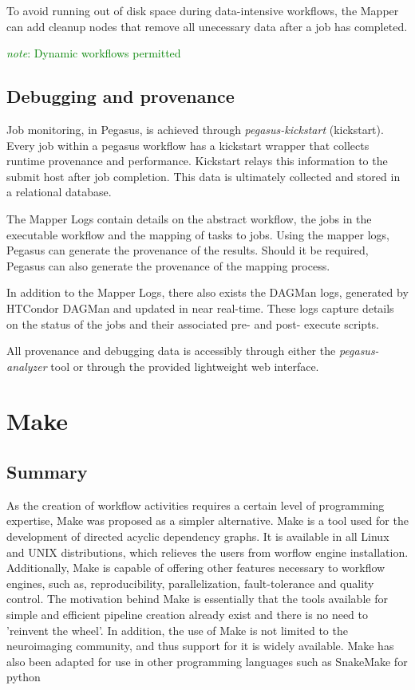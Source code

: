 \documentclass{report}
\newcommand{\note}[1]{\textcolor{green}{\textit{note}: #1}}
\begin{document}
        To avoid running out of disk space during data-intensive workflows, the Mapper can add cleanup nodes that remove all unecessary data after a job has completed.
 
        \note{Dynamic workflows permitted}

        \subsection{Debugging and provenance}
         Job monitoring, in Pegasus, is achieved through \textit{pegasus-kickstart} (kickstart). Every job within a pegasus workflow has a kickstart wrapper that collects runtime provenance
        and performance. Kickstart relays this information to the submit host after job completion. This data is ultimately collected and stored in a relational database.

        The Mapper Logs contain details on the abstract workflow, the jobs in the executable workflow 
        and the mapping of tasks to jobs. Using the mapper logs, Pegasus can generate the provenance of the results. Should it be required, Pegasus can also generate the provenance of the 
        mapping process.

        In addition to the Mapper Logs, there also exists the DAGMan logs, generated by HTCondor DAGMan and updated in near real-time. These logs capture details on the status of the jobs
        and their associated pre- and post- execute scripts.

        All provenance and debugging data is accessibly through either the \textit{pegasus-analyzer} tool or through the provided lightweight web interface.  
         
           \section{Make}
        \subsection{Summary}
        As the creation of workflow activities requires a certain level of
programming expertise, Make was proposed as a simpler alternative. Make is a
tool used for the development of directed acyclic dependency graphs. It is
available in all Linux and UNIX distributions, which relieves the users from
worflow engine installation. Additionally, Make is capable of offering other
features necessary to workflow engines, such as, reproducibility,
parallelization, fault-tolerance and quality control. The motivation behind Make
is essentially that the tools available for simple and efficient pipeline
creation already exist and there is no need to 'reinvent the wheel'. In
addition, the use of Make is not limited to the neuroimaging community, and thus
support for it is widely available. Make has also been adapted for use in other
programming languages such as SnakeMake for python
\end{document}
